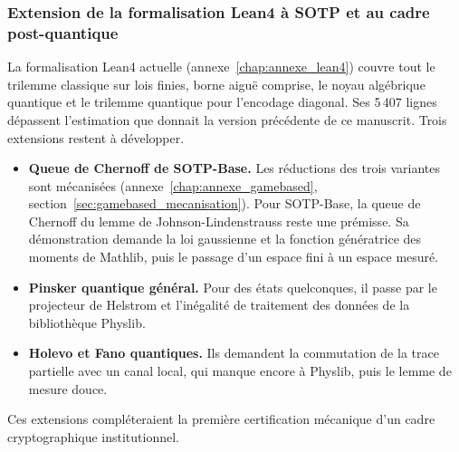 \begin{sloppypar}
\subsubsection{Extension de la formalisation Lean4 \`a SOTP et au cadre post-quantique}
\label{subsubsec:extension_lean4_sotp_pq}

La formalisation Lean4 actuelle (annexe~\ref{chap:annexe_lean4}) couvre tout le trilemme
classique sur lois finies, borne aigu\"e comprise, le noyau alg\'ebrique quantique et le trilemme
quantique pour l'encodage diagonal. Ses 5\,407 lignes d\'epassent l'estimation que donnait la
version pr\'ec\'edente de ce manuscrit. Trois extensions restent \`a d\'evelopper.

\begin{itemize}
    \item \textbf{Queue de Chernoff de SOTP-Base.} Les r\'eductions des trois variantes sont
          m\'ecanis\'ees (annexe~\ref{chap:annexe_gamebased}, section~\ref{sec:gamebased_mecanisation}).
          Pour SOTP-Base, la queue de Chernoff du lemme de Johnson-Lindenstrauss reste une
          pr\'emisse. Sa d\'emonstration demande la loi gaussienne et la fonction g\'en\'eratrice
          des moments de Mathlib, puis le passage d'un espace fini \`a un espace mesur\'e.
    \item \textbf{Pinsker quantique g\'en\'eral.} Pour des \'etats quelconques, il passe par le
          projecteur de Helstrom et l'in\'egalit\'e de traitement des donn\'ees de la biblioth\`eque
          Physlib.
    \item \textbf{Holevo et Fano quantiques.} Ils demandent la commutation de la trace partielle
          avec un canal local, qui manque encore \`a Physlib, puis le lemme de mesure douce.
\end{itemize}

Ces extensions compl\'eteraient la premi\`ere certification m\'ecanique d'un cadre
cryptographique institutionnel.
\end{sloppypar}


